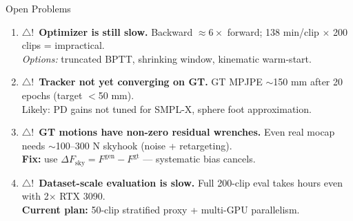 \documentclass[aspectratio=169, 10pt]{beamer}
\newcommand{\warn}{\textcolor{warnred}{$\triangle$!}}
\begin{document}

\begin{frame}{Open Problems}
  \small
  \begin{enumerate}\setlength\itemsep{0.4em}
    \item \warn\ \textbf{Optimizer is still slow.}
    Backward $\approx 6\times$ forward; 138 min/clip $\times$ 200 clips = impractical.\\
    \textit{Options:} truncated BPTT, shrinking window, kinematic warm-start.

    \item \warn\ \textbf{Tracker not yet converging on GT.}
    GT MPJPE $\sim$150 mm after 20 epochs (target $<$50 mm).\\
    Likely: PD gains not tuned for SMPL-X, sphere foot approximation.

    \item \warn\ \textbf{GT motions have non-zero residual wrenches.}
    Even real mocap needs $\sim$100--300 N skyhook (noise + retargeting).\\
    \textbf{Fix:} use $\Delta F_\text{sky} = F^\text{gen} - F^\text{gt}$ --- systematic bias cancels.

    \item \warn\ \textbf{Dataset-scale evaluation is slow.}
    Full 200-clip eval takes hours even with 2$\times$ RTX 3090.\\
    \textbf{Current plan:} 50-clip stratified proxy + multi-GPU parallelism.
  \end{enumerate}
\end{frame}

\end{document}
